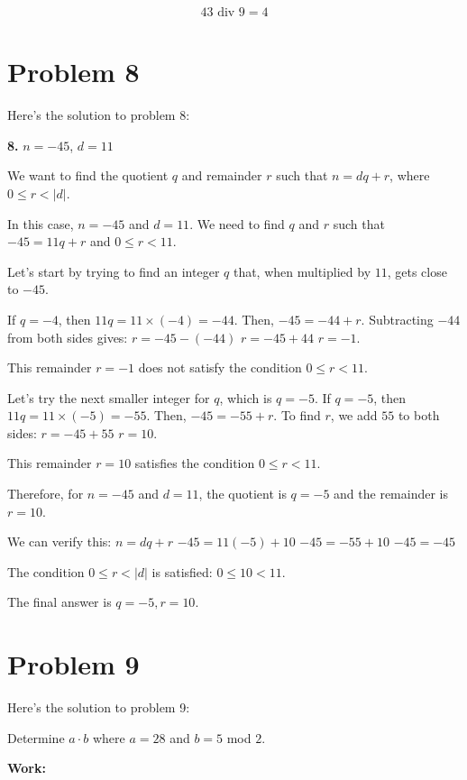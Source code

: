 \documentclass{article}
\begin{document}
\begin{align} 43 \text{ div } 9 = 4 \end{align}

\newpage

\section*{\textbf{Problem 8}}
Here's the solution to problem 8:

\textbf{8. } $n = -45$, $d = 11$

We want to find the quotient $q$ and remainder $r$ such that $n = dq + r$, where $0 \leq r < |d|$.

In this case, $n = -45$ and $d = 11$. We need to find $q$ and $r$ such that $-45 = 11q + r$ and $0 \leq r < 11$.

Let's start by trying to find an integer $q$ that, when multiplied by $11$, gets close to $-45$.

If $q = -4$, then $11q = 11 \times (-4) = -44$.
Then, $-45 = -44 + r$.
Subtracting $-44$ from both sides gives:
$r = -45 - (-44)$
$r = -45 + 44$
$r = -1$.

This remainder $r = -1$ does not satisfy the condition $0 \leq r < 11$.

Let's try the next smaller integer for $q$, which is $q = -5$.
If $q = -5$, then $11q = 11 \times (-5) = -55$.
Then, $-45 = -55 + r$.
To find $r$, we add $55$ to both sides:
$r = -45 + 55$
$r = 10$.

This remainder $r = 10$ satisfies the condition $0 \leq r < 11$.

Therefore, for $n = -45$ and $d = 11$, the quotient is $q = -5$ and the remainder is $r = 10$.

We can verify this:
$n = dq + r$
$-45 = 11(-5) + 10$
$-45 = -55 + 10$
$-45 = -45$

The condition $0 \leq r < |d|$ is satisfied: $0 \leq 10 < 11$.

The final answer is $\boxed{q = -5, r = 10}$.

\newpage

\section*{\textbf{Problem 9}}
Here's the solution to problem 9:



Determine $a \cdot b$ where $a=28$ and $b=5$ mod $2$.

\textbf{Work:}
\end{document}
